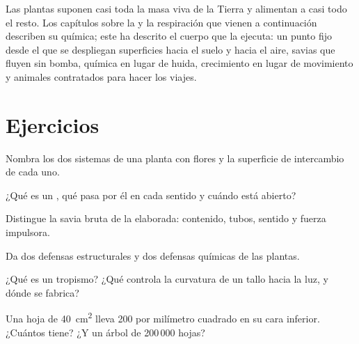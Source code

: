 \begin{remark}\label{rem:g12:plant-rooted-life:half}
Las plantas suponen casi toda la masa viva de la Tierra y alimentan a
casi todo el resto. Los capítulos sobre la  y la
respiración que vienen a continuación describen su química; este ha
descrito el cuerpo que la ejecuta: un punto fijo desde el que se
despliegan superficies hacia el suelo y hacia el aire, savias que
fluyen sin bomba, química en lugar de huida, crecimiento en lugar de
movimiento y animales contratados para hacer los viajes.
\end{remark}

\section{Ejercicios}

\begin{exercise}[$\star$]\label{exo:g12:plant-rooted-life:1}
Nombra los dos sistemas de una planta con flores y la superficie de
intercambio de cada uno.
\end{exercise}

\begin{exercise}[$\star$]\label{exo:g12:plant-rooted-life:2}
¿Qué es un , qué pasa por él en cada sentido y cuándo está
abierto?
\end{exercise}

\begin{exercise}[$\star$]\label{exo:g12:plant-rooted-life:3}
Distingue la savia bruta de la elaborada: contenido, tubos, sentido y
fuerza impulsora.
\end{exercise}

\begin{exercise}[$\star$]\label{exo:g12:plant-rooted-life:4}
Da dos defensas estructurales y dos defensas químicas de las plantas.
\end{exercise}

\begin{exercise}[$\star$]\label{exo:g12:plant-rooted-life:5}
¿Qué es un tropismo? ¿Qué  controla la curvatura de un tallo
hacia la luz, y dónde se fabrica?
\end{exercise}

\begin{exercise}[$\star\star$]\label{exo:g12:plant-rooted-life:6}
Una hoja de \qty{40}{cm^2} lleva 200  por milímetro cuadrado en
su cara inferior. ¿Cuántos  tiene? ¿Y un árbol de 200\,000
hojas?
\end{exercise}

